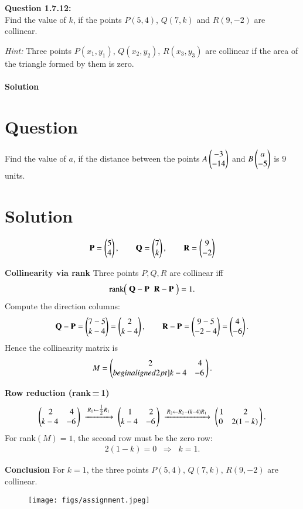 \documentclass[journal]{IEEEtran}
\begin{document}

\textbf{Question 1.7.12:} \\
\textbf{} Find the value of $k$, if the points $P(5,4)$, $Q(7,k)$ and $R(9,-2)$ are collinear. 

\textit{Hint:} Three points $P(x_1,y_1)$, $Q(x_2,y_2)$, $R(x_3,y_3)$ are collinear if the area of the triangle formed by them is zero.\\
\\

\textbf{Solution}



\section*{Question}
Find the value of $a$, if the distance between the points 
$A\begin{pmatrix}-3\\-14\end{pmatrix}$ and $B\begin{pmatrix}a\\-5\end{pmatrix}$ is $9$ units.

\section*{Solution}
\begin{align}
\mathbf P=\begin{pmatrix}5\\4\end{pmatrix},\qquad
\mathbf Q=\begin{pmatrix}7\\k\end{pmatrix},\qquad
\mathbf R=\begin{pmatrix}9\\-2\end{pmatrix}
\end{align}

 \textbf{Collinearity via rank}
Three points \(P,Q,R\) are collinear iff
\begin{align}
\operatorname{rank}\!\begin{pmatrix}\; \mathbf Q-\mathbf P \;\; \mathbf R-\mathbf P \;\end{pmatrix}=1.
\end{align}
Compute the direction columns:
\begin{align}
\mathbf Q-\mathbf P=\begin{pmatrix}7-5\\k-4\end{pmatrix}=\begin{pmatrix}2\\k-4\end{pmatrix},\qquad
\mathbf R-\mathbf P=\begin{pmatrix}9-5\\-2-4\end{pmatrix}=\begin{pmatrix}4\\-6\end{pmatrix}.
\end{align}
Hence the collinearity matrix is
\begin{align}
M=\begin{pmatrix}\,2 & 4\\begin{align}2pt] k-4 & -6\,\end{pmatrix}.
\end{align}

\textbf{Row reduction (rank\,=\,1)}
\begin{align}
\begin{pmatrix}\,2 & 4\\ k-4 & -6\,\end{pmatrix}
\;\xrightarrow{\,R_1\leftarrow \tfrac12 R_1\,}\;
\begin{pmatrix}\,1 & 2\\k-4 & -6\,\end{pmatrix}
\;\xrightarrow{\,R_2\leftarrow R_2-(k-4)R_1\,}\;
\begin{pmatrix}\,1 & 2\\0 & 2(1-k)\,\end{pmatrix}.
\end{align}
For rank\((M)=1\), the second row must be the zero row:
\begin{align}
2(1-k)=0 \;\;\Rightarrow\;\; k=1.
\end{align}

\textbf{Conclusion}
For \(k=\boxed{1}\), the three points \(P(5,4),\,Q(7,k),\,R(9,-2)\) are collinear.

\newpage
\begin{figure}
    \centering
\texttt{[image: figs/assignment.jpeg]}
    \caption{}
    \label{fig:placeholder}
\end{figure}
\end{document}
